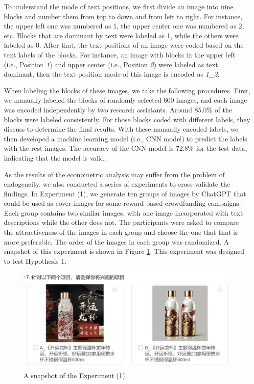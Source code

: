 \documentclass[a4paper]{article}
\begin{document}
To understand the mode of text positions, we first divide an image into nine blocks and number them from top to down and from left to right. For instance, the upper left one was numbered as 1, the upper center one was numbered as 2, etc. Blocks that are dominant by text were labeled as 1, while the others were labeled as 0. After that, the text positions of an image were coded based on the text labels of the blocks.  For instance, an image with blocks in the upper left (i.e., Position \emph{1}) and upper center (i.e., Position \emph{2}) were labeled as text dominant, then the text position mode of this image is encoded as \emph{1\_2}.  

When labeling the blocks of these images, we take the following procedures. First, we manually labeled the blocks of randomly selected 600 images, and each image was encoded independently by two research assistants. Around 85.0\% of the blocks were labeled consistently. For those blocks coded with different labels, they discuss to determine the final results. With these manually encoded labels, we then developed a machine learning model (i.e., CNN model) to predict the labels with the rest images. The accuracy of the CNN model is 72.8\% for the test data, indicating that the model is valid. 

As the results of the econometric analysis may suffer from the problem of endogeneity, we also conducted a series of experiments to cross-validate the findings. In Experiment (1), we generate ten groups of images by ChatGPT that could be used as cover images for some reward-based crowdfunding campaigns. Each group contains two similar images, with one image incorporated with text descriptions while the other does not. The participants were asked to compare the attractiveness of the images in each group and choose the one that that is more preferable. The order of the images in each group was randomized. A snapshot of this experiment is shown in Figure \ref{fig:Experiment1}. This experiment was designed to test Hypothesis 1. 



\begin{figure}[h!]
    \centering
    \includegraphics[width=0.8\linewidth]{experiment1.jpg}
    \caption{A snapshot of the Experiment (1).}
    \label{fig:Experiment1}
\end{figure}
\end{document}
